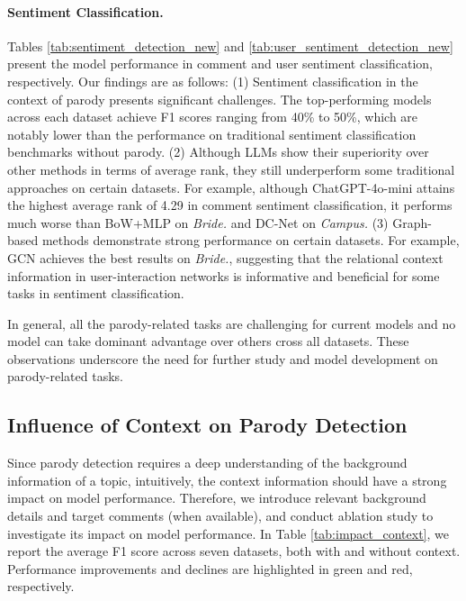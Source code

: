 

\paragraph{Sentiment Classification.} Tables \ref{tab:sentiment_detection_new} and \ref{tab:user_sentiment_detection_new} present the model performance in comment and user sentiment classification, respectively. Our findings are as follows: (1) Sentiment classification in the context of parody presents significant challenges. The top-performing models across each dataset achieve F1 scores ranging from 40\% to 50\%, which are notably lower than the performance on traditional sentiment classification benchmarks without parody\citep{senti_benchmark1,senti_benchmark2}. (2) Although LLMs show their superiority over other methods in terms of average rank, they still underperform some traditional approaches on certain datasets. For example, although ChatGPT-4o-mini attains the highest average rank of 4.29 in comment sentiment classification, it performs much worse than BoW+MLP on \textit{Bride.} and DC-Net on \textit{Campus.} (3) Graph-based methods demonstrate strong performance on certain datasets. For example, GCN achieves the best results on \textit{Bride.}, suggesting that the relational context information in user-interaction networks is informative and beneficial for some tasks in sentiment classification.

In general, all the parody-related tasks are challenging for current models and no model can take dominant advantage over others cross all datasets. These observations underscore the need for further study and model development on parody-related tasks.

\subsection{Influence of Context on Parody Detection}\label{sec:exp_context_impact}


Since parody detection requires a deep understanding of the background information of a topic, intuitively, the context information should have a strong impact on model performance. Therefore, we introduce relevant background details and target comments (when available), and conduct ablation study to investigate its impact on model performance. In Table \ref{tab:impact_context}, we report the average F1 score across seven datasets, both with and without context. Performance improvements and declines are highlighted in \textcolor{increase}{green} and \textcolor{decrease}{red}, respectively.

